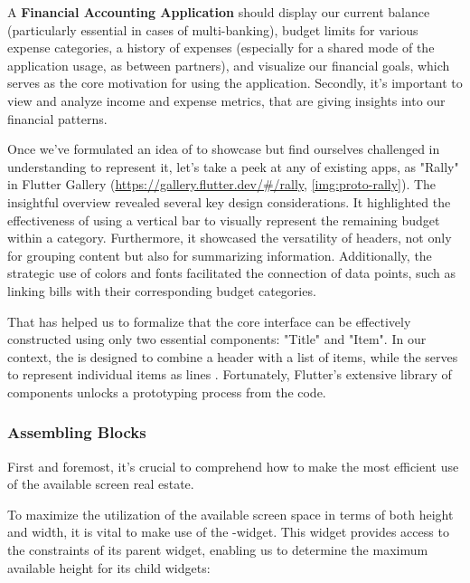 A \textbf{Financial Accounting Application} should display our current balance (particularly essential in cases of 
multi-banking), budget limits for various expense categories, a history of expenses (especially for a shared mode of 
the application usage, as between partners), and visualize our financial goals, which serves as the core motivation for 
using the application. Secondly, it's important to view and analyze income and expense metrics, that are giving insights 
into our financial patterns. 

Once we've formulated an idea of  to showcase but find ourselves challenged in understanding  to 
represent it, let's take a peek at any of existing apps, as "Rally" in Flutter Gallery 
(\href{https://gallery.flutter.dev/\#/rally}{https://gallery.flutter.dev/\#/rally}, \cref{img:proto-rally}).
The insightful overview revealed several key design considerations. It highlighted the effectiveness of using a 
vertical bar to visually represent the remaining budget within a category. Furthermore, it showcased the versatility of 
headers, not only for grouping content but also for summarizing information. Additionally, the strategic use of colors 
and fonts facilitated the connection of data points, such as linking bills with their corresponding budget categories. 

That has helped us to formalize that the core interface can be effectively constructed using only two essential 
components: "Title" and "Item". In our context, the  is designed to combine a header with a list of items, 
while the  serves to represent individual items as lines . Fortunately, Flutter's extensive 
library of components unlocks a prototyping process from the code.



\subsubsection{Assembling Blocks}

First and foremost, it's crucial to comprehend how to make the most efficient use of the available screen real estate.

To maximize the utilization of the available screen space in terms of both height and width, it is vital to make use of 
the -widget. This widget provides access to the constraints of its parent widget, enabling us to 
determine the maximum available height for its child widgets:

